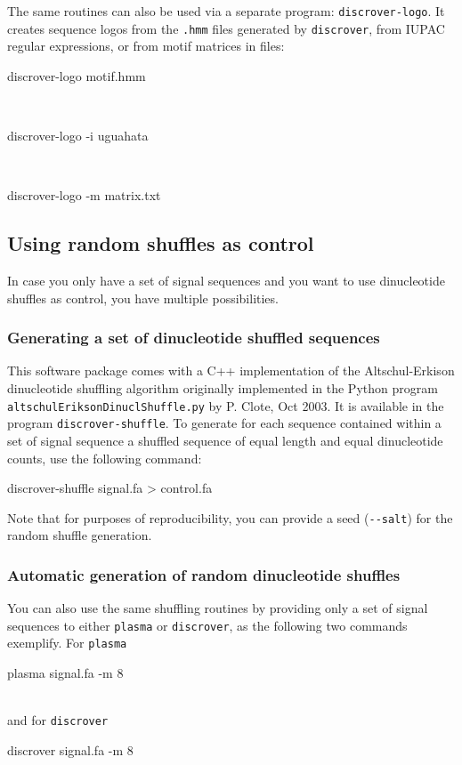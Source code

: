 \documentclass[a4paper]{article}
\newcommand{\plasma}[0]{\texttt{plasma}}
\newcommand{\discrover}[0]{\texttt{discrover}}
\newcommand{\dinuclshuffle}[0]{\texttt{discrover-shuffle}}
\begin{document}
The same routines can also be used via a separate program: \verb|discrover-logo|.
It creates sequence logos from the \verb|.hmm| files generated by \verb|discrover|, from IUPAC regular expressions, or from motif matrices in files:\\
\begin{verbbox}
discrover-logo motif.hmm
\end{verbbox}
\fbox{\theverbbox[t]}\\
\begin{verbbox}
discrover-logo -i uguahata
\end{verbbox}
\fbox{\theverbbox[t]}\\
\begin{verbbox}
discrover-logo -m matrix.txt
\end{verbbox}
\fbox{\theverbbox[t]}

\subsection{Using random shuffles as control}
In case you only have a set of signal sequences and you want to use dinucleotide shuffles as control, you have multiple possibilities.
\subsubsection{Generating a set of dinucleotide shuffled sequences}
This software package comes with a C++ implementation of the Altschul-Erkison dinucleotide shuffling algorithm originally implemented in the Python program \verb|altschulEriksonDinuclShuffle.py| by P. Clote, Oct 2003.
It is available in the program \dinuclshuffle{}.
To generate for each sequence contained within a set of signal sequence a shuffled sequence of equal length and equal dinucleotide counts, use the following command:\\
\begin{verbbox}
discrover-shuffle signal.fa > control.fa
\end{verbbox}
\fbox{\theverbbox[t]}

Note that for purposes of reproducibility, you can provide a seed (\verb|--salt|) for the random shuffle generation.

\subsubsection{Automatic generation of random dinucleotide shuffles}
You can also use the same shuffling routines by providing only a set of signal sequences to either \plasma{} or \discrover{}, as the following two commands exemplify.
For \plasma{}\\
\begin{verbbox}
plasma signal.fa -m 8
\end{verbbox}
\fbox{\theverbbox[t]}\\
and for \discrover{}\\
\begin{verbbox}
discrover signal.fa -m 8
\end{verbbox}
\fbox{\theverbbox[t]}
\end{document}
